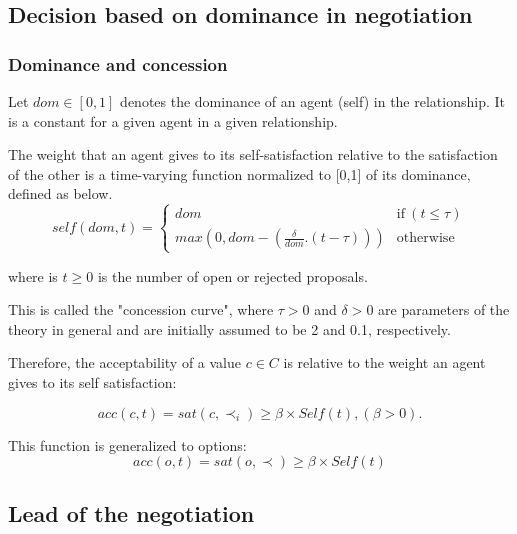 \documentclass{llncs}
\begin{document}
				\subsection{Decision based on dominance in negotiation}
				\label{decision}
				\subsubsection {Dominance and concession}
				Let  $dom \in [0, 1] $ denotes the dominance of an agent (self) in the relationship.  It is a constant for a given agent in a given relationship.
				
				The weight that an agent gives to its self-satisfaction relative to	the satisfaction of the other is a time-varying function normalized to 	[0,1] of its dominance, defined as below.
				\begin{equation}
					self(dom, t) = \left\{\begin{array}{ll}
					dom & \mathrm{if\ } (t \leq \tau)\\
					max(0, dom - (\frac{\delta}{dom} . (t - \tau))) & \mathrm{otherwise}
					\end{array}\right.
				\end{equation}
				
				
				where is $t \geq 0$ is the number of open or rejected proposals.
				
				This is called the "concession curve", where $\tau > 0$ and $\delta > 0$
				are parameters of the theory in general and are initially assumed to
				be 2 and 0.1, respectively.
				
				Therefore, the acceptability of a value $c \in C$  is relative to the weight an agent gives to its self satisfaction:
				
				\begin{equation}
					acc(c, t) = sat(c, \prec_i) \geq  \beta \times Self(t) ,  (\beta >0).
				\end{equation}
				
				This function is generalized to options:
				\begin{equation}
				acc(o, t) = sat(o, \prec) \geq  \beta \times Self(t)
				\end{equation}

				
				
				\subsection{Lead of the negotiation}
				
\end{document}
